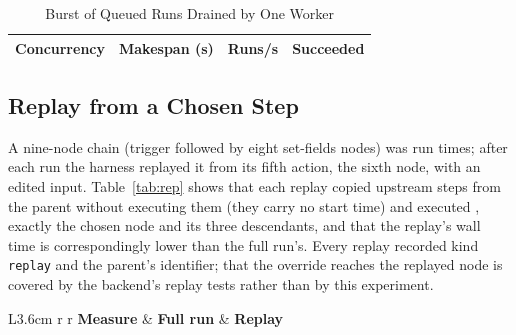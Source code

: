\documentclass[conference]{IEEEtran}
\begin{document}
\begin{table}[!htbp]
\centering
\caption{Burst of \THRn{} Queued Runs Drained by One Worker}
\label{tab:thr}
\small
\begin{tabular}{r r r r}
\toprule
\textbf{Concurrency} & \textbf{Makespan (s)} & \textbf{Runs/s} & \textbf{Succeeded} \\
\midrule

\end{tabular}
\end{table}

\subsection{Replay from a Chosen Step}
A nine-node chain (trigger followed by eight set-fields nodes) was run \REPreps{} times; after each run the harness replayed it from its fifth action, the sixth node, with an edited input. Table~\ref{tab:rep} shows that each replay copied \REPcopy{} upstream steps from the parent without executing them (they carry no start time) and executed \REPexec{}, exactly the chosen node and its three descendants, and that the replay's wall time is correspondingly lower than the full run's. Every replay recorded kind \texttt{replay} and the parent's identifier; that the override reaches the replayed node is covered by the backend's replay tests rather than by this experiment.

\begin{table}[!htbp]
\centering
\caption{Replay of a Nine-Node Chain from Its Sixth Node (\REPreps{} Repetitions; Full-Run Step Counts Hold by Construction, Replay Counts Were Identical in Every Repetition)}
\label{tab:rep}
\small
\begin{tabular}{L{3.6cm} r r}
\toprule
\textbf{Measure} & \textbf{Full run} & \textbf{Replay} \\
\midrule

\end{tabular}
\end{table}
\end{document}
